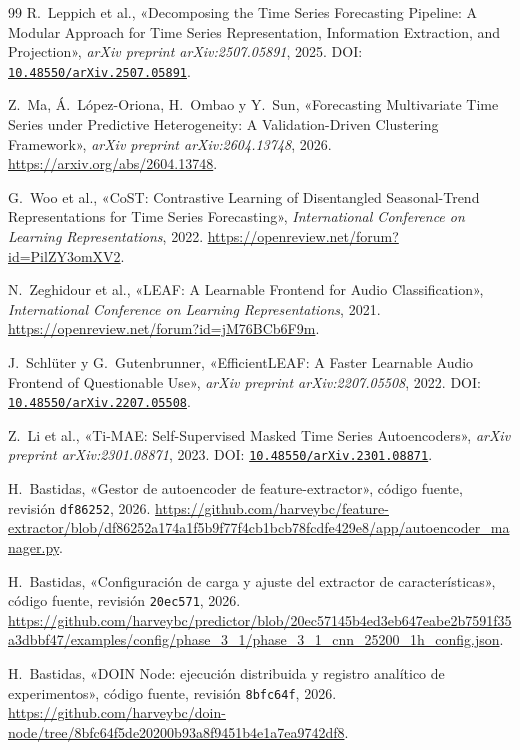 \documentclass[11pt,letterpaper]{article}
\begin{document}
\begin{thebibliography}{99}
R.~Leppich et al., «Decomposing the Time Series Forecasting Pipeline: A Modular Approach for Time Series Representation, Information Extraction, and Projection», \emph{arXiv preprint arXiv:2507.05891}, 2025. DOI: \href{https://doi.org/10.48550/arXiv.2507.05891}{\nolinkurl{10.48550/arXiv.2507.05891}}.

Z.~Ma, Á.~López-Oriona, H.~Ombao y Y.~Sun, «Forecasting Multivariate Time Series under Predictive Heterogeneity: A Validation-Driven Clustering Framework», \emph{arXiv preprint arXiv:2604.13748}, 2026. \url{https://arxiv.org/abs/2604.13748}.

G.~Woo et al., «{CoST}: Contrastive Learning of Disentangled Seasonal-Trend Representations for Time Series Forecasting», \emph{International Conference on Learning Representations}, 2022. \url{https://openreview.net/forum?id=PilZY3omXV2}.

N.~Zeghidour et al., «{LEAF}: A Learnable Frontend for Audio Classification», \emph{International Conference on Learning Representations}, 2021. \url{https://openreview.net/forum?id=jM76BCb6F9m}.

J.~Schl{\"u}ter y G.~Gutenbrunner, «{EfficientLEAF}: A Faster Learnable Audio Frontend of Questionable Use», \emph{arXiv preprint arXiv:2207.05508}, 2022. DOI: \href{https://doi.org/10.48550/arXiv.2207.05508}{\nolinkurl{10.48550/arXiv.2207.05508}}.

Z.~Li et al., «{Ti-MAE}: Self-Supervised Masked Time Series Autoencoders», \emph{arXiv preprint arXiv:2301.08871}, 2023. DOI: \href{https://doi.org/10.48550/arXiv.2301.08871}{\nolinkurl{10.48550/arXiv.2301.08871}}.

H.~Bastidas, «Gestor de autoencoder de feature-extractor», código fuente, revisión \texttt{df86252}, 2026. \url{https://github.com/harveybc/feature-extractor/blob/df86252a174a1f5b9f77f4cb1bcb78fcdfe429e8/app/autoencoder_manager.py}.

H.~Bastidas, «Configuración de carga y ajuste del extractor de características», código fuente, revisión \texttt{20ec571}, 2026. \url{https://github.com/harveybc/predictor/blob/20ec57145b4ed3eb647eabe2b7591f35a3dbbf47/examples/config/phase_3_1/phase_3_1_cnn_25200_1h_config.json}.

H.~Bastidas, «DOIN Node: ejecución distribuida y registro analítico de experimentos», código fuente, revisión \texttt{8bfc64f}, 2026. \url{https://github.com/harveybc/doin-node/tree/8bfc64f5de20200b93a8f9451b4e1a7ea9742df8}.


\end{thebibliography}
\end{document}
